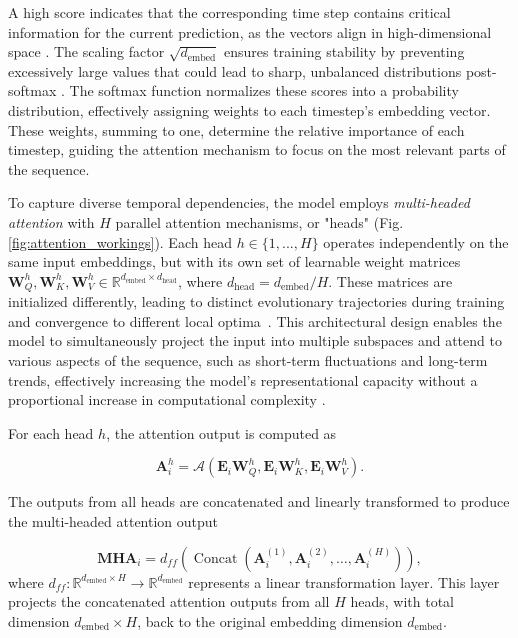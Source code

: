\documentclass{ieeetmlcn}
\begin{document}
A high score indicates that the corresponding time step contains critical information for the current prediction, as the vectors align in high-dimensional space \cite{luong2015effective}. The scaling factor $\sqrt{d_{\text{embed}}}$ ensures training stability by preventing excessively large values that could lead to sharp, unbalanced distributions post-softmax \cite{xu2015show}. The softmax function normalizes these scores into a probability distribution, effectively assigning weights to each timestep's embedding vector. These weights, summing to one, determine the relative importance of each timestep, guiding the attention mechanism to focus on the most relevant parts of the sequence.

To capture diverse temporal dependencies, the model employs \textit{multi-headed attention} \cite{michel2019sixteen} with $H$ parallel attention mechanisms, or "heads" (Fig. \ref{fig:attention_workings}). Each head $h \in \{1, ..., H\}$ operates independently on the same input embeddings, but with its own set of learnable weight matrices $\mathbf{W}_Q^h, \mathbf{W}_K^h, \mathbf{W}_V^h \in \mathbb{R}^{d_{\text{embed}} \times d_{\text{head}}}$, where $d_{\text{head}} = d_{\text{embed}} / H$. These matrices are initialized differently, leading to distinct evolutionary trajectories during training and convergence to different local optima~\cite{zhang2019improving}. This architectural design enables the model to simultaneously project the input into multiple subspaces and attend to various aspects of the sequence, such as short-term fluctuations and long-term trends, effectively increasing the model's representational capacity without a proportional increase in computational complexity \cite{vaswani2017attention}.

For each head $h$, the attention output is computed as

\begin{equation}
    \mathbf{A}_i^h = \mathcal{A}(\mathbf{E}_i\mathbf{W}_Q^h, \mathbf{E}_i\mathbf{W}_K^h, \mathbf{E}_i\mathbf{W}_V^h).
\end{equation}

The outputs from all heads are concatenated and linearly transformed to produce the multi-headed attention output

\begin{equation}
    \mathbf{MHA}_i = d_{ff}(\operatorname{Concat}(\mathbf{A}_i^{(1)}, \mathbf{A}_i^{(2)}, \ldots, \mathbf{A}_i^{(H)})),
\end{equation}
where $d_{ff}: \mathbb{R}^{d_{\text{embed}} \times H} \rightarrow \mathbb{R}^{d_{\text{embed}}}$ represents a linear transformation layer. This layer projects the concatenated attention outputs from all $H$ heads, with total dimension $d_{\text{embed}} \times H$, back to the original embedding dimension $d_{\text{embed}}$.
\end{document}
